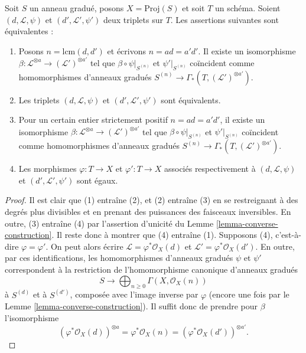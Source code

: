 \begin{lemma}
\label{lemma-equivalent}
Soit $S$ un anneau gradué, posons $X = \text{Proj}(S)$ et soit $T$ un schéma.
Soient $(d, \mathcal{L}, \psi)$ et $(d', \mathcal{L}', \psi')$ deux triplets
sur $T$. Les assertions suivantes sont équivalentes :
\begin{enumerate}
\item Posons $n = \text{lcm}(d, d')$ et écrivons $n = ad = a'd'$.
Il existe un isomorphisme
$\beta : \mathcal{L}^{\otimes a} \to (\mathcal{L}')^{\otimes a'}$ tel que
$\beta \circ \psi|_{S^{(n)}}$ et $\psi'|_{S^{(n)}}$ coïncident comme
homomorphismes d'anneaux gradués
$S^{(n)} \to \Gamma_*(T, (\mathcal{L}')^{\otimes a'})$.
\item Les triplets $(d, \mathcal{L}, \psi)$ et
$(d', \mathcal{L}', \psi')$ sont équivalents.
\item Pour un certain entier strictement positif $n = ad = a'd'$, il existe un
isomorphisme
$\beta : \mathcal{L}^{\otimes a} \to (\mathcal{L}')^{\otimes a'}$ tel que
$\beta \circ \psi|_{S^{(n)}}$ et $\psi'|_{S^{(n)}}$ coïncident comme
homomorphismes d'anneaux gradués
$S^{(n)} \to \Gamma_*(T, (\mathcal{L}')^{\otimes a'})$.
\item Les morphismes $\varphi : T \to X$ et $\varphi' : T \to X$ associés
respectivement à $(d, \mathcal{L}, \psi)$ et
$(d', \mathcal{L}', \psi')$ sont égaux.
\end{enumerate}
\end{lemma}

\begin{proof}
Il est clair que (1) entraîne (2), et (2) entraîne (3) en se restreignant à
des degrés plus divisibles et en prenant des puissances des faisceaux
inversibles. En outre, (3) entraîne (4) par l'assertion d'unicité du
Lemme \ref{lemma-converse-construction}. Il reste donc à montrer que (4)
entraîne (1). Supposons (4), c'est-à-dire $\varphi = \varphi'$.
On peut alors écrire
$\mathcal{L} = \varphi^*\mathcal{O}_X(d)$ et
$\mathcal{L}' = \varphi^*\mathcal{O}_X(d')$. En outre, par ces identifications,
les homomorphismes d'anneaux gradués $\psi$ et $\psi'$ correspondent à la
restriction de l'homomorphisme canonique d'anneaux gradués
$$
S \longrightarrow \bigoplus\nolimits_{n \geq 0} \Gamma(X, \mathcal{O}_X(n))
$$
à $S^{(d)}$ et à $S^{(d')}$, composée avec l'image inverse par $\varphi$
(encore une fois par le Lemme \ref{lemma-converse-construction}). Il suffit
donc de prendre pour $\beta$ l'isomorphisme
$$
(\varphi^*\mathcal{O}_X(d))^{\otimes a} =
\varphi^*\mathcal{O}_X(n) =
(\varphi^*\mathcal{O}_X(d'))^{\otimes a'}.
$$
\end{proof}

